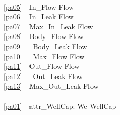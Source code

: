 \mnewfoil
\begin{multicols}{2}\LLLL
\bp
{} \\
\ref{pa05}\ \ In\_Flow {\EQ} Flow\\
\ref{pa06}\ \ In\_Leak {\EQ} Flow\\
\ref{pa07}\ \ Max\_In\_Leak {\EQ} Flow\\
\ref{pa08}\ \ Body\_Flow {\EQ} Flow\\
\ref{pa09}\ \ \ Body\_Leak {\EQ} Flow\\
\ref{pa10}\ \ \ Max\_Flow {\EQ} Flow\\
\ref{pa11}\ \ Out\_Flow {\EQ} Flow\\
\ref{pa12}\ \ \ Out\_Leak {\EQ} Flow \\
\ref{pa13}\ \ Max\_Out\_Leak {\EQ} Flow\\
\\
\ref{pa01}\ \ attr\_WellCap: We {\RIGHTARROW} WellCap\ \ \ \ \\

\end{multicols}
